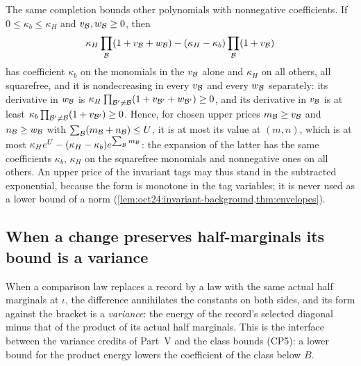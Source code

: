 \begin{remark}
The same completion bounds other polynomials with nonnegative coefficients.
If $0\le\kappa_b\le\kappa_H$ and $v_\mathcal B,w_\mathcal B\ge0$, then
\[
 \kappa_H\prod_\mathcal B(1+v_\mathcal B+w_\mathcal B)-(\kappa_H-\kappa_b)\prod_\mathcal B(1+v_\mathcal B)
\]
has coefficient $\kappa_b$ on the monomials in the $v_\mathcal B$ alone and $\kappa_H$
on all others, all squarefree, and it is nondecreasing in every $v_\mathcal B$ and
every $w_\mathcal B$ separately: its derivative in $w_\mathcal B$ is
$\kappa_H\prod_{\mathcal B'\ne\mathcal B}(1+v_{\mathcal B'}+w_{\mathcal B'})\ge0$, and its derivative in
$v_\mathcal B$ is at least $\kappa_b\prod_{\mathcal B'\ne\mathcal B}(1+v_{\mathcal B'})\ge0$. Hence, for
chosen upper prices $m_\mathcal B\ge v_\mathcal B$ and $n_\mathcal B\ge w_\mathcal B$ with
$\sum_\mathcal B(m_\mathcal B+n_\mathcal B)\le U$, it is at most its value at $(m,n)$, which is at
most $\kappa_He^U-(\kappa_H-\kappa_b)e^{\sum_\mathcal B m_\mathcal B}$: the expansion of the
latter has the same coefficients $\kappa_b$, $\kappa_H$ on the squarefree
monomials and nonnegative ones on all others. An upper price of the
invariant tags may thus stand in the subtracted exponential, because the form
is monotone in the tag variables; it is never used as a lower bound of a norm
(\cref{lem:oct24:invariant-background,thm:envelopes}).
\end{remark}

\subsection{When a change preserves half-marginals its bound is a variance}

When a comparison law replaces a record by a law with the same actual half
marginals at $\iota$, the difference annihilates the constants on both
sides, and its form against the bracket is a \emph{variance}: the energy of
the record's selected diagonal minus that of the product of its actual half
marginals. This is the interface between the variance credits of Part~V and
the class bounds (CP5): a lower bound for the product energy lowers the
coefficient of the class below $B$.

